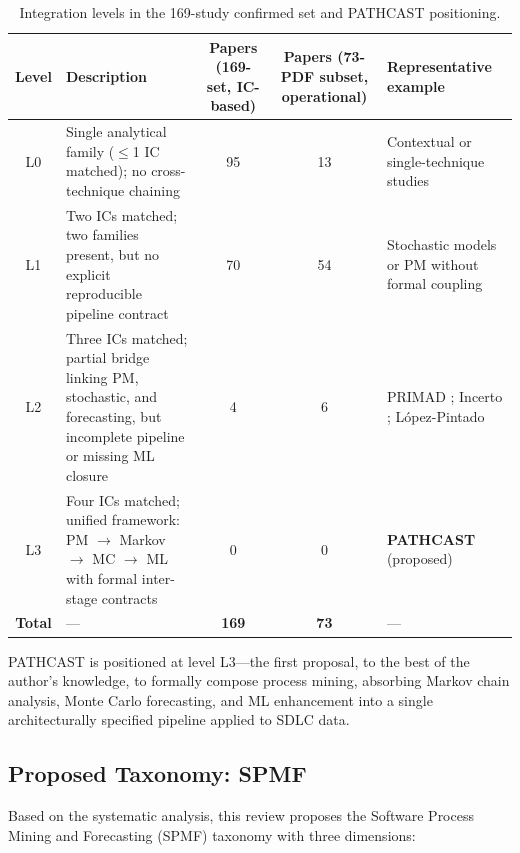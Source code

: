 \begin{table}[htbp]
\centering
\caption{Integration levels in the 169-study confirmed set and PATHCAST positioning.}
\label{tab:positioning}
\small
\setlength{\tabcolsep}{4pt}
\begin{tabular}{c p{4.8cm} c c p{3.4cm}}
\toprule
\textbf{Level} & \textbf{Description} & \textbf{Papers (169-set, IC-based)}
  & \textbf{Papers (73-PDF subset, operational)} & \textbf{Representative example} \\
\midrule
L0 & Single analytical family ($\leq$1 IC matched); no cross-technique chaining
  & 95 & 13 & Contextual or single-technique studies \\
L1 & Two ICs matched; two families present, but no explicit reproducible pipeline contract
  & 70 & 54 & Stochastic models or PM without formal coupling \\
L2 & Three ICs matched; partial bridge linking PM, stochastic, and forecasting, but incomplete pipeline or missing ML closure
  & 4 & 6 & PRIMAD \cite{guinea2025}; Incerto \cite{incerto2025}; L\'opez-Pintado \cite{lopezpintado2023} \\
L3 & Four ICs matched; unified framework: PM $\rightarrow$ Markov $\rightarrow$ MC $\rightarrow$ ML with formal inter-stage contracts
  & 0 & 0 & \textbf{PATHCAST} (proposed) \\
\midrule
\textbf{Total} & --- & \textbf{169} & \textbf{73} & --- \\
\bottomrule
\end{tabular}
\end{table}

PATHCAST is positioned at level L3---the first proposal, to the best of the
author's knowledge, to formally compose process mining, absorbing Markov chain
analysis, Monte Carlo forecasting, and ML enhancement into a single
architecturally specified pipeline applied to SDLC data.


\subsection{Proposed Taxonomy: SPMF}
\label{sec:slr-taxonomy}

Based on the systematic analysis, this review proposes the Software Process
Mining and Forecasting (SPMF) taxonomy with three dimensions:

